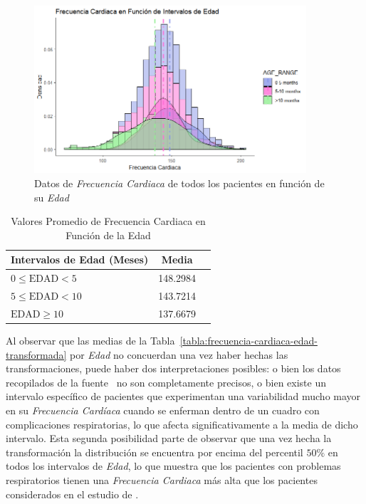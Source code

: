 \begin{figure}[H]
    \centering
    \includegraphics[width=0.9\textwidth]{img/frecuencia-cardiaca-edad.png}
    \caption{Datos de \textit{Frecuencia Cardiaca} de todos los pacientes en función de su \textit{Edad}}
    \label{fig:frecuencia-cardiaca-edad}
\end{figure}

\begin{table}[H]
    \centering
    \begin{tabular}{lcc}
        \toprule
        \textbf{Intervalos de Edad (Meses)} & \textbf{Media} \\
        \midrule
        $0 \leq \text{EDAD} < 5$ & 148.2984 \\
        $5 \leq \text{EDAD} < 10$ & 143.7214 \\
        $\text{EDAD} \geq 10$ & 137.6679 \\
        \bottomrule
    \end{tabular}
    \caption{Valores Promedio de Frecuencia Cardiaca en Función de la Edad}
    \label{tabla:frecuencia-cardiaca-edad}
\end{table}

Al observar que las medias de la Tabla~\ref{tabla:frecuencia-cardiaca-edad-transformada} por \textit{Edad} no concuerdan una vez haber hechas las transformaciones, puede haber dos interpretaciones posibles: o bien los datos recopilados de la fuente~\cite{percentilesFenton2015} no son completamente precisos, o bien existe un intervalo específico de pacientes que experimentan una variabilidad mucho mayor en su \textit{Frecuencia Cardíaca} cuando se enferman dentro de un cuadro con complicaciones respiratorias, lo que afecta significativamente a la media de dicho intervalo. Esta segunda posibilidad parte de observar que una vez hecha la transformación la distribución se encuentra por encima del percentil $50\%$ en todos los intervalos de \textit{Edad}, lo que muestra que los pacientes con problemas respiratorios tienen una \textit{Frecuencia Cardiaca} más alta que los pacientes considerados en el estudio de \cite{percentilesFenton2015}.

